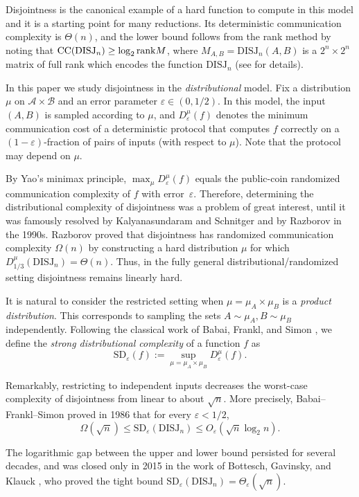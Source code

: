 \documentclass[11pt]{amsart}
\theoremstyle{definition}
\def\eps{\varepsilon}
\def\cA{\mathcal{A}}
\def\cB{\mathcal{B}}
\newcommand{\DISJ}{\mathrm{DISJ}}
\newcommand{\SD}{\mathrm{SD}}
\begin{document}
Disjointness is the canonical example of a hard function to compute in this model and it is a starting point for many reductions. Its deterministic communication complexity is $\Theta(n)$, and the lower bound follows from the rank method by noting that ${\rm CC}(\DISJ_n)\geq \log_2 {\rm rank} M$, where $M_{A, B}=\DISJ_{n}(A, B)$ is a $2^n\times 2^n$ matrix of full rank which encodes the function $\DISJ_n$ (see \cite{S} for details).

In this paper we study disjointness in the \emph{distributional} model.
Fix a distribution $\mu$ on $\cA\times\cB$ and an error parameter $\eps\in(0,1/2)$. In this model, the input $(A, B)$ is sampled according to $\mu$, and $D^\mu_\eps(f)$ denotes the minimum communication cost of a deterministic protocol that computes $f$ correctly on a $(1-\eps)$-fraction of pairs of inputs (with respect to $\mu$). Note that the protocol may depend on $\mu$. 

By Yao's minimax principle, $\max_{\mu} D^\mu_\eps(f)$ equals the public-coin randomized communication complexity of $f$ with error~$\eps$. Therefore, determining the distributional complexity of disjointness was a problem of great interest, until it was famously resolved by Kalyanasundaram and Schnitger \cite{KS92} and by Razborov \cite{R92} in the 1990s. Razborov proved that disjointness has randomized communication complexity $\Omega(n)$ by constructing a hard distribution $\mu$ for which $D^\mu_{1/3}(\DISJ_n)=\Theta(n)$. Thus, in the fully general distributional/randomized setting disjointness remains linearly hard.

It is natural to consider the restricted setting when $\mu=\mu_A\times \mu_B$ is a \textit{product distribution}. This corresponds to sampling the sets $A\sim \mu_A, B\sim \mu_B$ independently. Following the classical work of Babai, Frankl, and Simon \cite{BFS86}, we define the \textit{strong distributional complexity} of a function $f$ as
\[ \mathrm{SD}_\eps(f):=\sup_{\mu=\mu_A\times \mu_B} D^\mu_\eps(f). \]

Remarkably, restricting to independent inputs decreases the worst-case complexity of disjointness from linear to about $\sqrt n$. More precisely, Babai--Frankl--Simon \cite{BFS86} proved in 1986 that for every $\eps<1/2$,
\[ \Omega(\sqrt n)\leq\SD_\eps(\DISJ_n)\leq O_\eps(\sqrt n\log_2 n). \]

The logarithmic gap between the upper and lower bound persisted for several decades, and was closed only in 2015 in the work of Bottesch, Gavinsky, and Klauck \cite{BGK15}, who proved the tight bound $\SD_\eps(\DISJ_n)=\Theta_\eps(\sqrt n)$.
\end{document}
